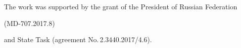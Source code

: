 














\Ack


\noindent


The work was supported by the grant of the President of Russian Federation


(MD-707.2017.8) 


and State Task (agreement  No.\,2.3440.2017/4.6).


 








\renewcommand{\bibname}{\protect\rmfamily References}







